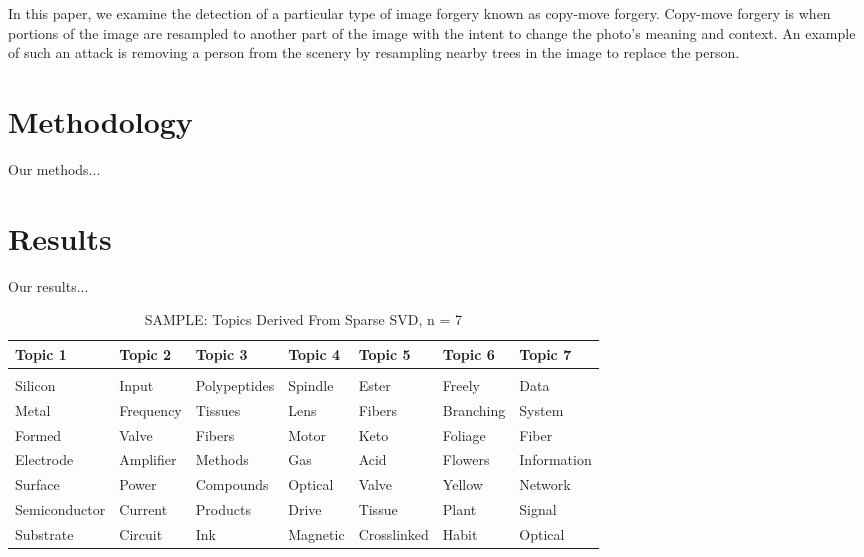 \documentclass[12pt]{article}
\begin{document}
\begin{raggedleft}
In this paper, we examine the detection of a particular type of image forgery known as copy-move forgery. Copy-move forgery is when portions of the image are resampled to another part of the image with the intent to change the photo's meaning and context. An example of such an attack is removing a person from the scenery by resampling nearby trees in the image to replace the person.
\end{raggedleft}

\section*{Methodology}

Our methods...

\section*{Results}

Our results...

\begin{table}[t]
\caption{SAMPLE: Topics Derived From Sparse SVD, n = 7}
\label{sparsesvd}
\begin{center}
\begin{tabular}{lllllll}
\multicolumn{1}{l}{\bf Topic 1} & \multicolumn{1}{l}{\bf Topic 2} & \multicolumn{1}{l}{\bf Topic 3} & \multicolumn{1}{l}{\bf Topic 4} & \multicolumn{1}{l}{\bf Topic 5} & \multicolumn{1}{l}{\bf Topic 6} & \multicolumn{1}{l}{\bf Topic 7}
\\ \hline \\
Silicon & Input & Polypeptides & Spindle & Ester & Freely & Data \\
Metal & Frequency & Tissues & Lens & Fibers & Branching & System \\
Formed & Valve & Fibers & Motor & Keto & Foliage & Fiber \\
Electrode & Amplifier & Methods & Gas & Acid & Flowers & Information \\
Surface & Power & Compounds & Optical & Valve & Yellow & Network \\
Semiconductor & Current & Products & Drive & Tissue & Plant & Signal \\
Substrate & Circuit & Ink & Magnetic & Crosslinked & Habit & Optical \\
\end{tabular}
\end{center}
\end{table}
\end{document}
